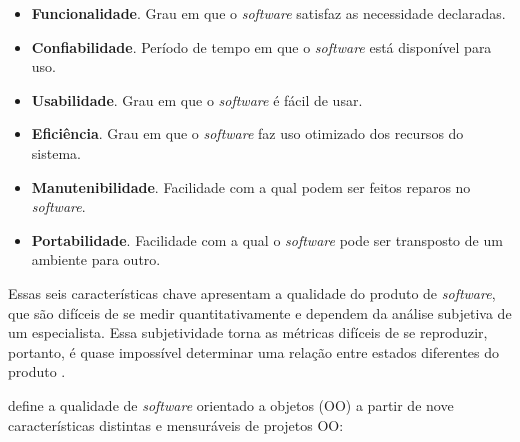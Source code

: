 \begin{itemize}
	\item \textbf{Funcionalidade}. Grau em que o \textit{software} satisfaz as necessidade declaradas.
	\item \textbf{Confiabilidade}. Período de tempo em que o \textit{software} está disponível para uso.
	\item \textbf{Usabilidade}. Grau em que o \textit{software} é fácil de usar.
	\item \textbf{Eficiência}. Grau em que o \textit{software} faz uso otimizado dos recursos do sistema.
	\item \textbf{Manutenibilidade}. Facilidade com a qual podem ser feitos reparos no \textit{software}.
	\item \textbf{Portabilidade}. Facilidade com a qual o \textit{software} pode ser transposto de um ambiente para outro.
\end{itemize}

Essas seis características chave apresentam a qualidade do produto de \textit{software}, que são difíceis de se medir quantitativamente e dependem da análise subjetiva de um especialista. Essa subjetividade torna as métricas difíceis de se reproduzir, portanto, é quase impossível determinar uma relação entre estados diferentes do produto \cite{Pressman:2010}.

 define a qualidade de \textit{software} orientado a objetos (OO) a partir de nove características distintas e mensuráveis de projetos OO:


